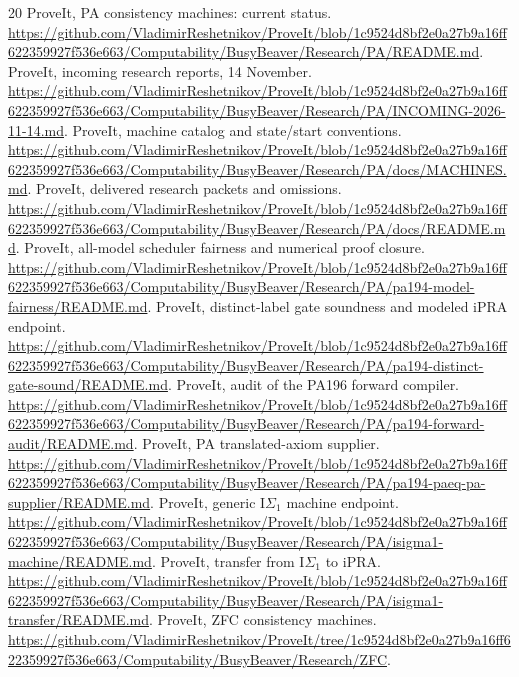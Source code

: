 \documentclass[11pt]{article}
\newcommand{\IS}{\mathrm I\Sigma_1}
\begin{document}
\clearpage
\begin{thebibliography}{20}\footnotesize
\setlength{\itemsep}{3pt}
\setlength{\parskip}{0pt}
 ProveIt, PA consistency machines: current status.
\url{https://github.com/VladimirReshetnikov/ProveIt/blob/1c9524d8bf2e0a27b9a16ff622359927f536e663/Computability/BusyBeaver/Research/PA/README.md}.
 ProveIt, incoming research reports, 14 November.
\url{https://github.com/VladimirReshetnikov/ProveIt/blob/1c9524d8bf2e0a27b9a16ff622359927f536e663/Computability/BusyBeaver/Research/PA/INCOMING-2026-11-14.md}.
 ProveIt, machine catalog and state/start conventions.
\url{https://github.com/VladimirReshetnikov/ProveIt/blob/1c9524d8bf2e0a27b9a16ff622359927f536e663/Computability/BusyBeaver/Research/PA/docs/MACHINES.md}.
 ProveIt, delivered research packets and omissions.
\url{https://github.com/VladimirReshetnikov/ProveIt/blob/1c9524d8bf2e0a27b9a16ff622359927f536e663/Computability/BusyBeaver/Research/PA/docs/README.md}.
 ProveIt, all-model scheduler fairness and numerical proof closure.
\url{https://github.com/VladimirReshetnikov/ProveIt/blob/1c9524d8bf2e0a27b9a16ff622359927f536e663/Computability/BusyBeaver/Research/PA/pa194-model-fairness/README.md}.
 ProveIt, distinct-label gate soundness and modeled iPRA endpoint.
\url{https://github.com/VladimirReshetnikov/ProveIt/blob/1c9524d8bf2e0a27b9a16ff622359927f536e663/Computability/BusyBeaver/Research/PA/pa194-distinct-gate-sound/README.md}.
 ProveIt, audit of the PA196 forward compiler.
\url{https://github.com/VladimirReshetnikov/ProveIt/blob/1c9524d8bf2e0a27b9a16ff622359927f536e663/Computability/BusyBeaver/Research/PA/pa194-forward-audit/README.md}.
 ProveIt, PA translated-axiom supplier.
\url{https://github.com/VladimirReshetnikov/ProveIt/blob/1c9524d8bf2e0a27b9a16ff622359927f536e663/Computability/BusyBeaver/Research/PA/pa194-paeq-pa-supplier/README.md}.
 ProveIt, generic $\IS$ machine endpoint.
\url{https://github.com/VladimirReshetnikov/ProveIt/blob/1c9524d8bf2e0a27b9a16ff622359927f536e663/Computability/BusyBeaver/Research/PA/isigma1-machine/README.md}.
 ProveIt, transfer from $\IS$ to iPRA.
\url{https://github.com/VladimirReshetnikov/ProveIt/blob/1c9524d8bf2e0a27b9a16ff622359927f536e663/Computability/BusyBeaver/Research/PA/isigma1-transfer/README.md}.
 ProveIt, ZFC consistency machines.
\url{https://github.com/VladimirReshetnikov/ProveIt/tree/1c9524d8bf2e0a27b9a16ff622359927f536e663/Computability/BusyBeaver/Research/ZFC}.

\end{thebibliography}
\end{document}

